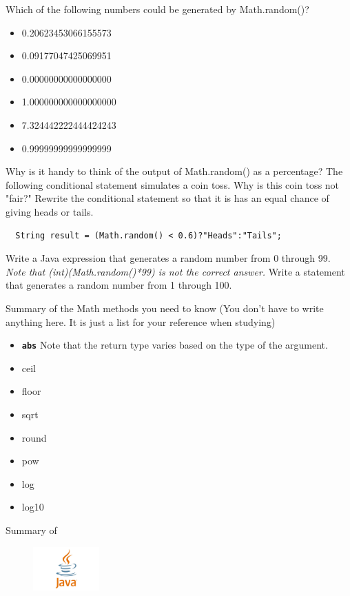 \documentclass[letterpaper,11pt]{exam}
\begin{document}
\begin{questions}
\question Which of the following numbers could be generated by Math.random()?
\begin{itemize}
  \item  0.20623453066155573
  \item  0.09177047425069951
  \item  0.00000000000000000
  \item 1.000000000000000000
  \item 7.324442222444424243
  \item  0.99999999999999999
\end{itemize}
\question Why is it handy to think of the output of Math.random() as a percentage?
\question The following conditional statement simulates a coin toss.  Why is this coin toss not "fair?"  Rewrite the conditional statement so that it is has an equal chance of giving heads or tails.
\begin{verbatim}
  String result = (Math.random() < 0.6)?"Heads":"Tails";
\end{verbatim}
\vspace{1cm}
\question Write a Java expression that generates a random number from 0 through 99.  \textit{Note that (int)(Math.random()*99) is not the correct answer.}
\vspace{1cm}
\question Write a statement that generates a random number from 1 through 100.
\vspace{1cm}

\begin{samepage}
Summary of the Math methods you need to know (You don't have to write anything here.  It is just a list for your reference when studying)
\begin{itemize}
  \item \texttt{\textbf{abs}}  Note that the return type varies based on the type of the argument.
  \item ceil
  \item floor
  \item sqrt
  \item round
  \item pow
  \item log
  \item log10
\end{itemize}
Summary of 
\end{samepage}
 
\end{questions}
\begin{figure}[b]\label{end}
	\center
	\includegraphics[width=1in]{java}
\end{figure}
\end{document}
